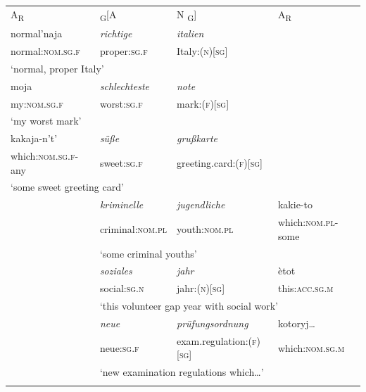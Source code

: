 \begin{table}
\begin{small}
\begin{tabular}{m{8.2em}m{6.2em}m{8.3em}m{8.3em}} 
\midrule
	\addlinespace[2mm]
	    A\textsubscript{R} 		& \textsubscript{G}[A		& N \textsubscript{G}]		& A\textsubscript{R}\\ 
	\addlinespace[2mm] 
	\midrule
	\addlinespace[2mm]
		normal'naja	& \textit{richtige}	& \textit{italien}	& \\
		normal:\textsc{nom.sg.f}	& proper:\textsc{sg.f}		& Italy:(\textsc{n})[\textsc{sg}]	& \\
		\multicolumn{4}{l}{`normal, proper Italy'} \\
		\addlinespace[2mm]
		
		moja	& \textit{schlechteste}	& \textit{note}	& \\
		my:\textsc{nom.sg.f} & worst:\textsc{sg.f}	& mark:(\textsc{f})[\textsc{sg}]	 &  \\
		\multicolumn{4}{l}{`my worst mark'} \\
		\addlinespace[2mm]
		
		kakaja-n't'	& \textit{süße}	& \textit{grußkarte}	& \\
		which:\textsc{nom.sg.f}-any & sweet:\textsc{sg.f}	& greeting.card:(\textsc{f})[\textsc{sg}]	&	\\
		\multicolumn{4}{l}{`some sweet greeting card'} \\
		\addlinespace[2mm]
		
		& \textit{kriminelle}	& \textit{jugendliche}	& kakie-to	\\
		& criminal:\textsc{nom.pl}	& youth:\textsc{nom.pl}		& which:\textsc{nom.pl}-some \\
		& \multicolumn{3}{l}{`some criminal youths'} \\
		\addlinespace[2mm] 
			
		& \textit{soziales}	& \textit{jahr}		& ètot \\
		& social:\textsc{sg.n}	& jahr:(\textsc{n})[\textsc{sg}]     & this:\textsc{acc.sg.m} \\
		& \multicolumn{3}{l}{`this volunteer gap year with social work'} \\
		\addlinespace[2mm] 
		
		& \textit{neue}	& \textit{prüfungsordnung} & kotoryj\dots \\
		& neue:\textsc{sg.f}	& exam.regulation:(\textsc{f})[\textsc{sg}] & which:\textsc{nom.sg.m} \\
	    & \multicolumn{3}{l}{`new examination regulations which\dots'} \\
		\addlinespace[2mm]
		\midrule
		

\end{tabular}
\end{small}
\end{table}
